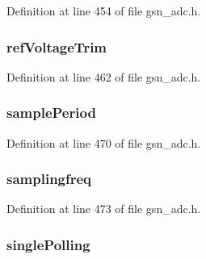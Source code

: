 Definition at line 454 of file gsn\_\-adc.h.

\hypertarget{a00023_aaee241ccf09d4b6bb1c7096fb0348538}{
\subsubsection[{refVoltageTrim}]{ {\bf refVoltageTrim}}}
\label{a00023_aaee241ccf09d4b6bb1c7096fb0348538}


Definition at line 462 of file gsn\_\-adc.h.

\hypertarget{a00023_a0751375e87151bb22632378129ce9257}{
\subsubsection[{samplePeriod}]{ {\bf samplePeriod}}}
\label{a00023_a0751375e87151bb22632378129ce9257}


Definition at line 470 of file gsn\_\-adc.h.

\hypertarget{a00023_a39c59a3009220218e522b97f632699ea}{
\subsubsection[{samplingfreq}]{ {\bf samplingfreq}}}
\label{a00023_a39c59a3009220218e522b97f632699ea}


Definition at line 473 of file gsn\_\-adc.h.

\hypertarget{a00023_a4626fcb8594673b9212d4e9284b8b36c}{
\subsubsection[{singlePolling}]{ {\bf singlePolling}}}
\label{a00023_a4626fcb8594673b9212d4e9284b8b36c}



